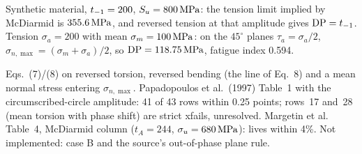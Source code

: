  Synthetic material, $t_{-1}=200$, $S_u=800\,\mathrm{MPa}$: the tension limit implied by
McDiarmid is $355.6\,\mathrm{MPa}$, and reversed tension at that amplitude gives $\mathrm{DP}=t_{-1}$. Tension
$\sigma_a=200$ with mean $\sigma_m=100\,\mathrm{MPa}$: on the $45^\circ$ planes $\tau_a=\sigma_a/2$,
$\sigma_{n,\max}=(\sigma_m+\sigma_a)/2$, so $\mathrm{DP}=118.75\,\mathrm{MPa}$, fatigue index 0.594.

 Eqs.~(7)/(8) on reversed torsion, reversed bending (the line of Eq.~8) and a
mean normal stress entering $\sigma_{n,\max}$. Papadopoulos et al.\ (1997) Table~1 with the
circumscribed-circle amplitude: 41 of 43 rows within 0.25 points; rows~17 and~28 (mean torsion with
phase shift) are strict xfails, unresolved. Margetin et al.\ \cite{margetin2016} Table~4, McDiarmid column
($t_A=244$, $\sigma_u=680\,\mathrm{MPa}$): lives within 4\%. Not implemented: case B and the source's
out-of-phase plane rule.
